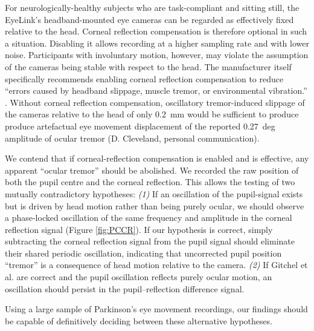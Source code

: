 \documentclass[jou,a4paper]{apa6}
\begin{document}
For neurologically-healthy subjects who are task-compliant and sitting still, the EyeLink's headband-mounted eye cameras can be regarded as effectively fixed relative to the head. Corneal reflection compensation is therefore optional in such a situation. Disabling it allows recording at a higher sampling rate and with lower noise. Participants with involuntary motion, however, may violate the assumption of the cameras being stable with respect to the head. The manufacturer itself specifically recommends enabling corneal reflection compensation to reduce ``errors caused by headband slippage, muscle tremor, or environmental vibration.'' \citep{SR-Research-Ltd2002EyeLink-II-User}. Without corneal reflection compensation, oscillatory tremor-induced slippage of the cameras relative to the head of only 0.2~mm would be sufficient to produce produce artefactual eye movement displacement of the reported 0.27~deg amplitude of ocular tremor (D. Cleveland, personal communication).

We contend that if corneal-reflection compensation is enabled and is effective, any apparent ``ocular tremor'' should be abolished. We recorded the raw position of both the pupil centre and the corneal reflection. This allows the testing of two mutually contradictory hypotheses: \textit{(1)} If an oscillation of the pupil-signal exists but is driven by head motion rather than being purely ocular, we should observe a phase-locked oscillation of the same frequency and amplitude in the corneal reflection signal (Figure \ref{fig:PCCR}). If our hypothesis is correct, simply subtracting the corneal reflection signal from the pupil signal should eliminate their shared periodic oscillation, indicating that uncorrected pupil position ``tremor'' is a consequence of head motion relative to the camera. \textit{(2)} If Gitchel et al. are correct and the pupil oscillation reflects purely ocular motion, an oscillation should persist in the pupil--reflection difference signal.

Using a large sample of Parkinson's eye movement recordings, our findings should be capable of definitively deciding between these alternative hypotheses.
\end{document}
